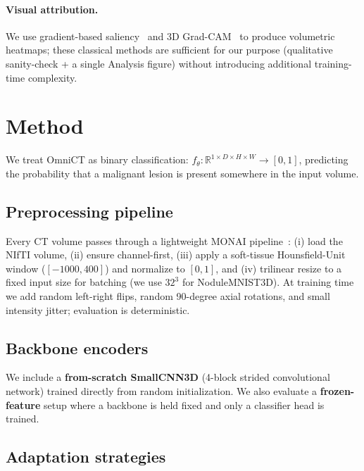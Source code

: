 \documentclass{article}
\begin{document}
\paragraph{Visual attribution.}
We use gradient-based saliency~\citep{simonyan2014_saliency} and 3D
Grad-CAM~\citep{selvaraju2017_gradcam} to produce volumetric heatmaps;
these classical methods are sufficient for our purpose
(qualitative sanity-check + a single Analysis figure) without
introducing additional training-time complexity.

\section{Method}

We treat OmniCT as binary classification: $f_\theta : \mathbb{R}^{1
\times D \times H \times W} \to [0, 1]$, predicting the probability
that a malignant lesion is present somewhere in the input volume.

\subsection{Preprocessing pipeline}
\label{sec:preproc}

Every CT volume passes through a lightweight MONAI
pipeline~\citep{cardoso2022_monai}: (i) load the NIfTI volume,
(ii) ensure channel-first, (iii) apply a soft-tissue Hounsfield-Unit
window ($[-1000, 400]$) and normalize to $[0,1]$, and (iv) trilinear
resize to a fixed input size for batching (we use $32^3$ for
NoduleMNIST3D). At training time we add random left-right flips, random
90-degree axial rotations, and small intensity jitter; evaluation is
deterministic.

\subsection{Backbone encoders}
\label{sec:backbones}

We include a \textbf{from-scratch SmallCNN3D} (4-block strided
convolutional network) trained directly from random initialization. We
also evaluate a \textbf{frozen-feature} setup where a backbone is held
fixed and only a classifier head is trained.

\subsection{Adaptation strategies}
\label{sec:adapt}
\end{document}
